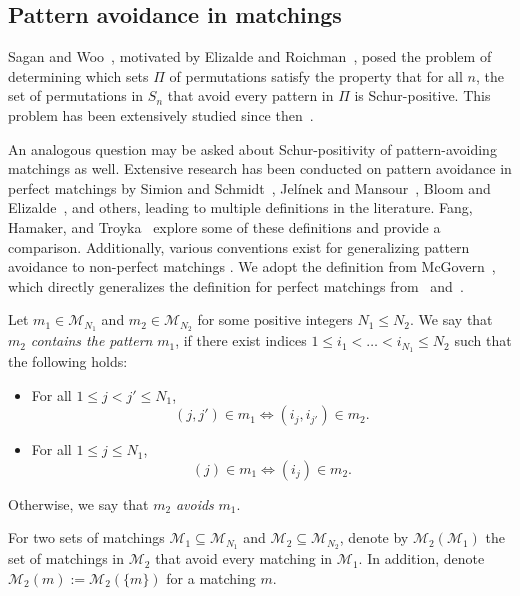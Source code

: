 \documentclass[ALCO]{cedram}
\newcommand{\M}{\mathcal{M}}
\begin{document}
\subsection{Pattern avoidance in matchings}
\label{subsec:pattern avoiding matchings}

Sagan and Woo~\cite{problem_find_pattern}, motivated by Elizalde and Roichman~\cite{arc_pattern_avoiding}, posed the problem of determining which sets $\Pi$ of permutations satisfy the property that for all $n$, the set of permutations in $S_n$ that avoid every pattern in $\Pi$ is Schur-positive. This problem has been extensively studied since then~\cite{S3_patterns_list, BloomSagan, my_pattern_theorem}.

An analogous question may be asked about Schur-positivity of pattern-avoiding matchings as well. Extensive research has been conducted on pattern avoidance in perfect matchings by Simion and Schmidt~\cite{simion1985restricted}, Jel\'{i}nek and Mansour~\cite{jelinek2010matchings}, Bloom and Elizalde~\cite{bloom2013pattern}, and others, leading to multiple definitions in the literature. Fang, Hamaker, and Troyka~\cite{fang2022pattern} explore some of these definitions and provide a comparison. Additionally, various conventions exist for generalizing pattern avoidance to non-perfect matchings \cite{mansour2013partial, fang2022pattern, mcgovern2019closures}. We adopt the definition from McGovern~\cite{mcgovern2019closures}, which directly generalizes the definition for perfect matchings from~\cite{jelinek2010matchings} and~\cite{cervetti2022enumeration}.

\begin{definition}
\label{def:pattern avoidance}
    Let $m_1 \in \M_{N_1}$ and $m_2 \in \M_{N_2}$ for some positive integers $N_1 \le N_2$. We say that $m_2$ \emph{contains the pattern} $m_1$, if there exist indices $1 \le i_1 < \dots < i_{N_1} \le N_2$ such that the following holds:
    \begin{itemize}
        \item For all $1 \le j < j' \le N_1$,
        \[
            (j,j') \in m_1 \Longleftrightarrow (i_j,i_{j'}) \in m_2.
        \]
        \item For all $1 \le j \le N_1$,
        \[
            (j) \in m_1 \Longleftrightarrow (i_j) \in m_2.
        \]
    \end{itemize}
    
    Otherwise, we say that $m_2$ \emph{avoids} $m_1$.

    For two sets of matchings $\M_1 \subseteq \M_{N_1}$ and $\M_2 \subseteq \M_{N_2}$, denote by $\M_2(\M_1)$ the set of matchings in $\M_2$ that avoid every matching in $\M_1$. In addition, denote $\M_2(m) := \M_2(\{m\})$ for a matching $m$.
\end{definition}
\end{document}
